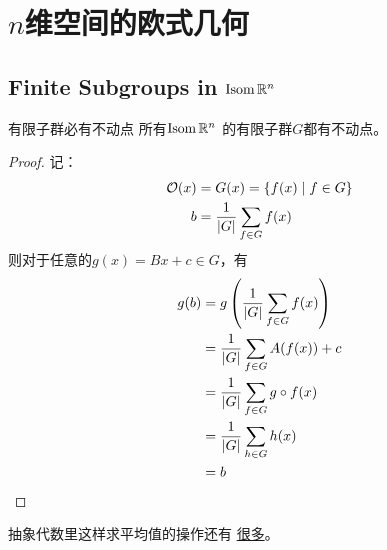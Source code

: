 \chapter{\(n\)维空间的欧式几何}
\section{Finite Subgroups in \(\operatorname{\mathrm{Isom}} \mathbb{R}^n\)}

\begin{theorem}{有限子群必有不动点}
    所有\(\operatorname{\mathrm{Isom}} \mathbb{R}^{n}\) 的有限子群\(G\)都有不动点。
\end{theorem}

\begin{proof}
    记：
    \begin{align*}
        \mathcal{O}(x) &= G(x) = \left\{ f(x) \mid f \in G \right\} \\
        b &=\frac{1}{\left|G\right|} \sum_{f \in G} f(x)
    \end{align*}
    则对于任意的\(g(x) = Bx + c \in G\)，有
    \begin{align*}
        g(b) &= g\left(\frac{1}{\left|G\right|} \sum_{f \in G} f(x)\right) \\
        &= \frac{1}{\left|G\right|} \sum_{f \in G} A(f(x)) + c \\
        &= \frac{1}{\left|G\right|} \sum_{f \in G} g \circ f(x) \\
        &= \frac{1}{\left|G\right|} \sum_{h \in G} h(x) \\
        &= b
    \end{align*}
\end{proof}

抽象代数里这样求平均值的操作还有
\href{https://math.stackexchange.com/questions/804802/uses-of-averaging-an-operator-over-the-elements-of-a-finite-group}{很多}。